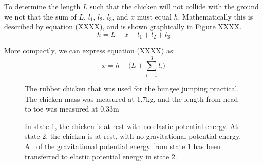 \documentclass[a4paper]{article}
\begin{document}
To determine the length $L$ such that the chicken will not collide with the ground we not that the sum of $L$, $l_1$, $l_2$, $l_3$, and $x$ must equal $h$. Mathematically this is described by equation (XXXX), and is shown graphically in Figure XXXX.
\begin{equation}
h = L + x + l_1 + l_2 + l_3
\end{equation}

More compactly, we can express equation (XXXX) as:
\begin{equation}
x = h - \bigg(L + \sum_{i=1}^{3} l_i \bigg)
\end{equation}

\begin{figure}[h]
	\centering
	\begin{minipage}[t]{0.45\textwidth}
		\centering
		\caption{The rubber chicken that was used for the bungee jumping practical. The chicken mass was measured at 1.7kg, and the length from head to toe was measured at 0.33m}
	\end{minipage}
	\hspace{1cm}
	\begin{minipage}[t]{0.45\textwidth}
		\centering
		\caption{In state 1, the chicken is at rest with no elastic potential energy. At state 2, the chicken is at rest, with no gravitational potential energy. All of the gravitational potential energy from state 1 has been transferred to elastic potential energy in state 2.}
	\end{minipage}
\end{figure}
\end{document}
